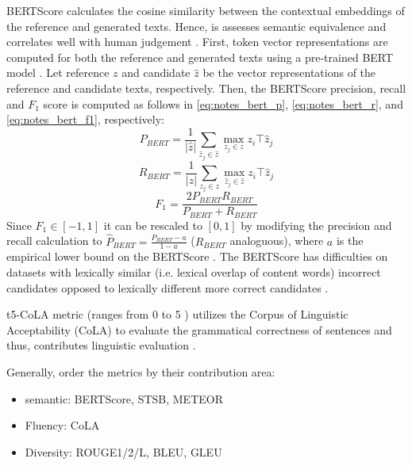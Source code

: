 BERTScore calculates the cosine similarity between the contextual embeddings of the reference and generated texts. 
Hence, is assesses semantic equivalence and correlates well with human judgement \citep{kurt_pehlivanoglu_comparative_2024}.
First, token vector representations are computed for both the reference and generated texts using a pre-trained BERT model \citep{hanna_fine_grained_2021}.
Let reference $z$ and candidate $\hat{z}$ be the vector representations of the reference and candidate texts, respectively.
Then, the BERTScore precision, recall and $F_1$ score is computed as follows in \autoref{eq:notes_bert_p}, \autoref{eq:notes_bert_r}, and \autoref{eq:notes_bert_f1}, respectively:
\begin{equation}
    P_{BERT} = \frac{1}{|\hat{z}|} \sum_{\hat{z}_j \in \hat{z}} \max_{z_j \in z} z_i\top \hat{z}_j
\label{eq:notes_bert_p}
\end{equation}
\begin{equation}
    R_{BERT} = \frac{1}{|z|} \sum_{z_j \in z} \max_{\hat{z}_j \in \hat{z}} z_i\top \hat{z}_j
\label{eq:notes_bert_r}
\end{equation}
\begin{equation}
    F_1 = \frac{2 P_{BERT} R_{BERT}}{P_{BERT} + R_{BERT}} 
\label{eq:notes_bert_f1}
\end{equation}
Since $F_1 \in \left[-1,1\right]$ it can be rescaled to $[0,1]$ by modifying the precision and recall calculation 
to $\hat{P}_{BERT} = \frac{P_{BERT} - a}{1 - a}$ ($R_{BERT}$ analoguous), where $a$ is the empirical lower bound on the BERTScore \citep{hanna_fine_grained_2021}.
The BERTScore has difficulties on datasets with lexically similar (i.e. lexical overlap of content words) incorrect candidates 
opposed to lexically different more correct candidates \citep{hanna_fine_grained_2021}.


\ac{t5}-CoLA metric (ranges from 0 to 5 \citep{kurt_pehlivanoglu_comparative_2024}) utilizes the Corpus of Linguistic Acceptability (CoLA) to evaluate the grammatical correctness of sentences and thus, 
contributes linguistic evaluation \citep{kurt_pehlivanoglu_comparative_2024}.

Generally, \citet{kurt_pehlivanoglu_comparative_2024} order the metrics by their contribution area:
\begin{itemize}
    \item semantic: BERTScore, STSB, METEOR
    \item Fluency: CoLA
    \item Diversity: ROUGE1/2/L, BLEU, GLEU
\end{itemize}

